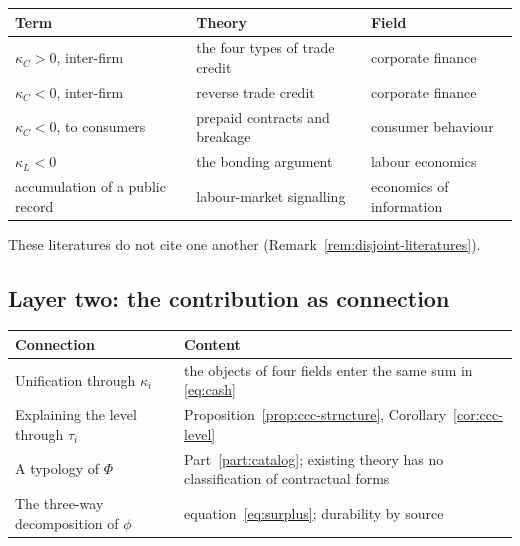\begin{center}
\begin{tabularx}{\textwidth}{@{}lXl@{}}
\toprule
Term & Theory & Field \\
\midrule
$\kappa_C>0$, inter-firm & the four types of trade credit \cite{petersen1997,schwartz1974} & corporate finance \\
$\kappa_C<0$, inter-firm & reverse trade credit \cite{mateut2014,daripa2011} & corporate finance \\
$\kappa_C<0$, to consumers & prepaid contracts and breakage \cite{dellavigna2006,einav2025,nber2026pnbl} & consumer behaviour \\
$\kappa_L<0$ & the bonding argument \cite{akerlof1986} & labour economics \\
accumulation of a public record & labour-market signalling \cite{spence1973} & economics of information \\
\bottomrule
\end{tabularx}
\label{tab:priorwork-layer1}
\end{center}

These literatures do not cite one another (Remark~\ref{rem:disjoint-literatures}).

\subsection*{Layer two: the contribution as connection}

\begin{center}
\begin{tabularx}{\textwidth}{@{}lX@{}}
\toprule
Connection & Content \\
\midrule
Unification through $\kappa_i$ & the objects of four fields enter the same sum in \eqref{eq:cash} \\
Explaining the level through $\tau_i$ & Proposition~\ref{prop:ccc-structure}, Corollary~\ref{cor:ccc-level} \\
A typology of $\Phi$ & Part~\ref{part:catalog}; existing theory has no classification of contractual forms \\
The three-way decomposition of $\phi$ & equation~\eqref{eq:surplus}; durability by source \\
\bottomrule
\end{tabularx}
\label{tab:priorwork-layer2}
\end{center}

